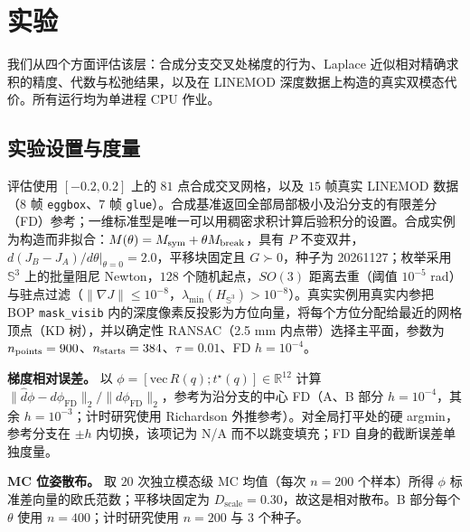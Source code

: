 \section{实验}\label{sec:experiments}

我们从四个方面评估该层：合成分支交叉处梯度的行为、Laplace 近似相对精确求积的精度、代数与松弛结果，以及在 LINEMOD 深度数据上构造的真实双模态代价。所有运行均为单进程 CPU 作业。

\subsection{实验设置与度量}\label{sec:metrics}

评估使用 $[-0.2,0.2]$ 上的 $81$ 点合成交叉网格，以及 $15$ 帧真实 LINEMOD 数据（$8$ 帧 \texttt{eggbox}、$7$ 帧 \texttt{glue}）。合成基准返回全部局部极小及沿分支的有限差分（FD）参考；一维标准型是唯一可以用稠密求积计算后验积分的设置。合成实例为构造而非拟合：$M(\theta)=M_{\rm sym}+\theta M_{\rm break}$，具有 $P$ 不变双井，$d(J_B-J_A)/d\theta|_{\theta=0}=2.0$，平移块固定且 $G\succ0$，种子为 20261127；枚举采用 $\mathbb{S}^3$ 上的批量阻尼 Newton，$128$ 个随机起点，$SO(3)$ 距离去重（阈值 $10^{-5}$ rad）与驻点过滤（$\|\nabla J\|\le10^{-8}$，$\lambda_{\min}(H_{\mathbb{S}^3})>10^{-8}$）。真实实例用真实内参把 BOP \texttt{mask\_visib} 内的深度像素反投影为方位向量，将每个方位分配给最近的网格顶点（KD 树），并以确定性 RANSAC（2.5 mm 内点带）选择主平面，参数为 $n_{\rm points}=900$、$n_{\rm starts}=384$、$\tau=0.01$、FD $h=10^{-4}$。

\textbf{梯度相对误差。} 以 $\phi=[\mathrm{vec}\,R(q);t^\star(q)]\in\mathbb{R}^{12}$ 计算 $\|\hat d\phi-d\phi_{\mathrm{FD}}\|_2/\|d\phi_{\mathrm{FD}}\|_2$，参考为沿分支的中心 FD（A、B 部分 $h=10^{-4}$，其余 $h=10^{-3}$；计时研究使用 Richardson 外推参考）。对全局打平处的硬 argmin，参考分支在 $\pm h$ 内切换，该项记为 N/A 而不以跳变填充；FD 自身的截断误差单独度量。

\textbf{MC 位姿散布。} 取 $20$ 次独立模态级 MC 均值（每次 $n=200$ 个样本）所得 $\phi$ 标准差向量的欧氏范数；平移块固定为 $D_{\text{scale}}=0.30$，故这是相对散布。B 部分每个 $\theta$ 使用 $n=400$；计时研究使用 $n=200$ 与 $3$ 个种子。

